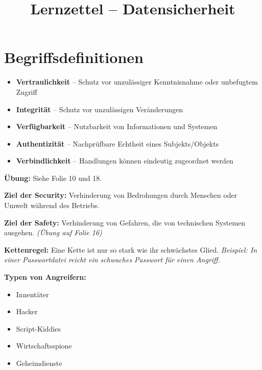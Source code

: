 \documentclass[a4paper,12pt]{article}
\title{\textbf{Lernzettel – Datensicherheit}}
\author{}
\date{}
\begin{document}
\maketitle
\tableofcontents
\newpage

\section{Begriffsdefinitionen}
\begin{itemize}
    \item \textbf{Vertraulichkeit} – Schutz vor unzulässiger Kenntnisnahme oder unbefugtem Zugriff
    \item \textbf{Integrität} – Schutz vor unzulässigen Veränderungen
    \item \textbf{Verfügbarkeit} – Nutzbarkeit von Informationen und Systemen
    \item \textbf{Authentizität} – Nachprüfbare Echtheit eines Subjekts/Objekts
    \item \textbf{Verbindlichkeit} – Handlungen können eindeutig zugeordnet werden
\end{itemize}

\vspace{0.5em}
\noindent\textbf{Übung:} Siehe Folie 10 und 18.

\vspace{1em}
\noindent\textbf{Ziel der Security:}  
Verhinderung von Bedrohungen durch Menschen oder Umwelt während des Betriebs.

\noindent\textbf{Ziel der Safety:}  
Verhinderung von Gefahren, die von technischen Systemen ausgehen.  
\textit{(Übung auf Folie 16)}

\vspace{1em}
\noindent\textbf{Kettenregel:}  
Eine Kette ist nur so stark wie ihr schwächstes Glied.  
\textit{Beispiel: In einer Passwortdatei reicht ein schwaches Passwort für einen Angriff.}

\vspace{1em}
\noindent\textbf{Typen von Angreifern:}
\begin{itemize}
    \item Innentäter
    \item Hacker
    \item \glqq Script-Kiddies\grqq
    \item Wirtschaftsspione
    \item Geheimdienste
\end{itemize}
\end{document}

